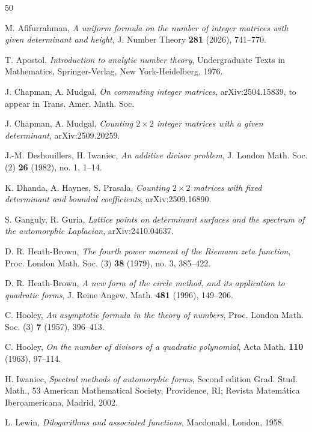 \documentclass[12pt,reqno]{amsart}
\theoremstyle{definition}
\theoremstyle{remark}
\numberwithin{equation}{section}
\newcommand\1{\mathds{1}}
\begin{document}
\begin{thebibliography}{50}


M. Afifurrahman, \emph{A uniform formula on the number of integer matrices with given determinant and height}, J. Number Theory \textbf{281} (2026), 741--770.

T. Apostol, \emph{Introduction to analytic number theory}, Undergraduate Texts in Mathematics, Springer-Verlag, New York-Heidelberg, 1976.

J. Chapman, A. Mudgal, \emph{On commuting integer matrices}, arXiv:2504.15839, to appear in Trans. Amer. Math. Soc. 

J. Chapman, A. Mudgal, \emph{Counting $2 \times 2$ integer matrices with a given determinant}, arXiv:2509.20259.

J.-M. Deshouillers, H. Iwaniec, \emph{An additive divisor problem}, J. London Math. Soc. (2) \textbf{26} (1982), no. 1, 1--14.

K. Dhanda, A. Haynes, S. Prasala, \emph{Counting $2\times 2$ matrices with fixed determinant and bounded coefficients}, arXiv:2509.16890.

S. Ganguly, R. Guria, \emph{Lattice points on determinant surfaces and the spectrum of the automorphic Laplacian}, arXiv:2410.04637.

D. R. Heath-Brown, \emph{The fourth power moment of the Riemann zeta function}, Proc. London Math. Soc. (3)   \textbf{38} (1979), no. 3, 385--422.

D. R. Heath-Brown, \emph{A new form of the circle method, and its application to quadratic forms}, J. Reine Angew.
Math. \textbf{481} (1996), 149--206.

C. Hooley, \emph{An asymptotic formula in the theory of numbers}, Proc. London Math. Soc. (3) \textbf{7} (1957), 396--413.

C. Hooley, \emph{On the number of divisors of a quadratic polynomial}, Acta Math. \textbf{110} (1963), 97--114.

H. Iwaniec, \emph{Spectral methods of automorphic forms}, Second edition Grad. Stud. Math., 53 American Mathematical Society, Providence, RI; Revista Matemática Iberoamericana, Madrid, 2002. 

L. Lewin, \emph{Dilogarithms and associated functions}, Macdonald, London, 1958.


\end{thebibliography}
\end{document}
